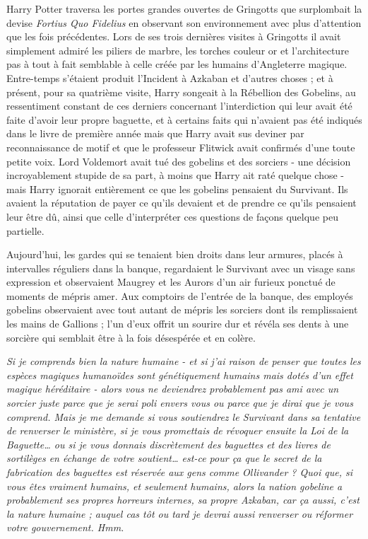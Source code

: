 Harry Potter traversa les portes grandes ouvertes de Gringotts que surplombait la devise \emph{Fortius Quo Fidelius}  en observant son environnement avec plus d'attention que les fois précédentes. Lors de ses trois dernières visites à Gringotts il avait simplement admiré les piliers de marbre, les torches couleur or et l'architecture pas à tout à fait semblable à celle créée par les humains d'Angleterre magique. Entre-temps s'étaient produit l'Incident à Azkaban et d'autres choses ; et à présent, pour sa quatrième visite, Harry songeait à la Rébellion des Gobelins, au ressentiment constant de ces derniers concernant l'interdiction qui leur avait été faite d'avoir leur propre baguette, et à certains faits qui n'avaient pas été indiqués dans le livre de première année mais que Harry avait sus deviner par reconnaissance de motif et que le professeur Flitwick avait confirmés d'une toute petite voix. Lord Voldemort avait tué des gobelins et des sorciers - une décision incroyablement stupide de sa part, à moins que Harry ait raté quelque chose - mais Harry ignorait entièrement ce que les gobelins pensaient du Survivant. Ils avaient la réputation de payer ce qu'ils devaient et de prendre ce qu'ils pensaient leur être dû, ainsi que celle d'interpréter ces questions de façons quelque peu partielle.

Aujourd'hui, les gardes qui se tenaient bien droits dans leur armures, placés à intervalles réguliers dans la banque, regardaient le Survivant avec un visage sans expression et observaient Maugrey et les Aurors d'un air furieux ponctué de moments de mépris amer. Aux comptoirs de l'entrée de la banque, des employés gobelins observaient avec tout autant de mépris les sorciers dont ils remplissaient les mains de Gallions ; l'un d'eux offrit un sourire dur et révéla ses dents à une sorcière qui semblait être à la fois désespérée et en colère.

\emph{Si je comprends bien la nature humaine - et si j'ai raison de penser que toutes les espèces magiques humanoïdes sont génétiquement humains mais dotés d'un effet magique héréditaire - alors vous ne deviendrez probablement pas ami avec un sorcier juste parce que je serai poli envers vous ou parce que je dirai que je vous comprend. Mais je me demande si vous soutiendrez le Survivant dans sa tentative de renverser le ministère, si je vous promettais de révoquer ensuite la Loi de la Baguette… ou si je vous donnais discrètement des baguettes et des livres de sortilèges en échange de votre soutient… est-ce pour ça que le secret de la fabrication des baguettes est réservée aux gens comme Ollivander ? Quoi que, si vous êtes vraiment humains, et seulement humains, alors la nation gobeline a probablement ses propres horreurs internes, sa propre Azkaban, car ça aussi, c'est la nature humaine ; auquel cas tôt ou tard je devrai aussi renverser ou réformer votre gouvernement. Hmm.} 


